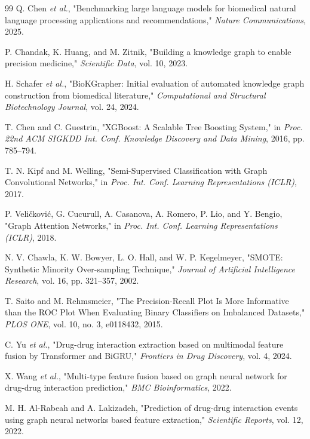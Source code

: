 \documentclass[conference]{Template/IEEEtran}
\begin{document}
\begin{thebibliography}{99}
Q. Chen \textit{et al.},
"Benchmarking large language models for biomedical natural language processing applications and recommendations," \textit{Nature Communications}, 2025.

P. Chandak, K. Huang, and M. Zitnik,
"Building a knowledge graph to enable precision medicine," \textit{Scientific Data}, vol. 10, 2023.

H. Schafer \textit{et al.},
"BioKGrapher: Initial evaluation of automated knowledge graph construction from biomedical literature," \textit{Computational and Structural Biotechnology Journal}, vol. 24, 2024.

T. Chen and C. Guestrin,
"XGBoost: A Scalable Tree Boosting System," in \textit{Proc. 22nd ACM SIGKDD Int. Conf. Knowledge Discovery and Data Mining}, 2016, pp. 785--794.

T. N. Kipf and M. Welling,
"Semi-Supervised Classification with Graph Convolutional Networks," in \textit{Proc. Int. Conf. Learning Representations (ICLR)}, 2017.

P. Veli\v{c}kovi\'{c}, G. Cucurull, A. Casanova, A. Romero, P. Lio, and Y. Bengio,
"Graph Attention Networks," in \textit{Proc. Int. Conf. Learning Representations (ICLR)}, 2018.

N. V. Chawla, K. W. Bowyer, L. O. Hall, and W. P. Kegelmeyer,
"SMOTE: Synthetic Minority Over-sampling Technique," \textit{Journal of Artificial Intelligence Research}, vol. 16, pp. 321--357, 2002.

T. Saito and M. Rehmsmeier,
"The Precision-Recall Plot Is More Informative than the ROC Plot When Evaluating Binary Classifiers on Imbalanced Datasets," \textit{PLOS ONE}, vol. 10, no. 3, e0118432, 2015.

C. Yu \textit{et al.},
"Drug-drug interaction extraction based on multimodal feature fusion by Transformer and BiGRU," \textit{Frontiers in Drug Discovery}, vol. 4, 2024.

X. Wang \textit{et al.},
"Multi-type feature fusion based on graph neural network for drug-drug interaction prediction," \textit{BMC Bioinformatics}, 2022.

M. H. Al-Rabeah and A. Lakizadeh,
"Prediction of drug-drug interaction events using graph neural networks based feature extraction," \textit{Scientific Reports}, vol. 12, 2022.


\end{thebibliography}
\end{document}
